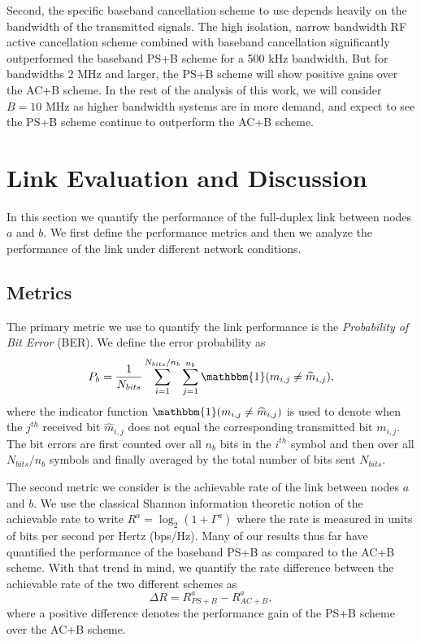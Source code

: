 \documentclass[12pt, journal,draftcls,letterpaper,onecolumn]{IEEEtran}
\begin{document}
Second, the specific baseband cancellation scheme to use depends heavily on the bandwidth of the transmitted signals.  The high isolation, narrow bandwidth RF active cancellation scheme combined with baseband cancellation significantly outperformed the baseband PS+B scheme for a 500 kHz bandwidth.  But for bandwidths 2 MHz and larger, the PS+B scheme will show positive gains over the AC+B scheme.  In the rest of the analysis of this work, we will consider $B = 10$ MHz  as higher bandwidth systems are in more demand, and expect to see the PS+B scheme continue to outperform the AC+B scheme.  







\section{Link Evaluation and Discussion}
\label{sec:results}
In this section we quantify the performance of the full-duplex link between nodes $a$ and $b$.  We first define the performance metrics and then we analyze the performance of the link under different network conditions.  

\subsection{Metrics}
The primary metric we use to quantify the link performance is the \emph{Probability of Bit Error} (BER).  We define the error probability as
\begin{equation}
P_b = \dfrac{1}{N_{bits}}\sum_{i=1}^{N_{bits}/n_b} \sum_{j=1}^{n_b} \mathbbm{1}(m_{i,j} \neq \widehat{m}_{i,j}),
\label{eq:ber}
\end{equation}
where the indicator function $\mathbbm{1}(m_{i,j} \neq \widehat{m}_{i,j})$ is used to denote when the $j^{th}$ received bit $\widehat{m}_{i,j}$ does not equal the corresponding transmitted bit $m_{i,j}$.  The bit errors are first counted over all $n_b$ bits in the $i^{th}$ symbol and then over all $N_{bits}/n_b$ symbols and finally averaged by the total number of bits sent $N_{bits}$.  

The second metric we consider is the achievable rate of the link between nodes $a$ and $b$.  We use the classical Shannon information theoretic notion \cite{cover_thomas} of the achievable rate to write $R^a= \log_2 (1+\Gamma^a)$ where the rate is measured in units of bits per second per Hertz (bps/Hz).  Many of our results thus far have quantified the performance of the baseband PS+B as compared to the AC+B scheme.  With that trend in mind, we quantify the rate difference between the achievable rate of the two different schemes as
\begin{equation}
\Delta R = R^a_{PS+B} - R^a_{AC+B},
\label{eq:rate_diff}
\end{equation}
where a positive difference denotes the performance gain of the PS+B scheme over the AC+B scheme.  
\end{document}
